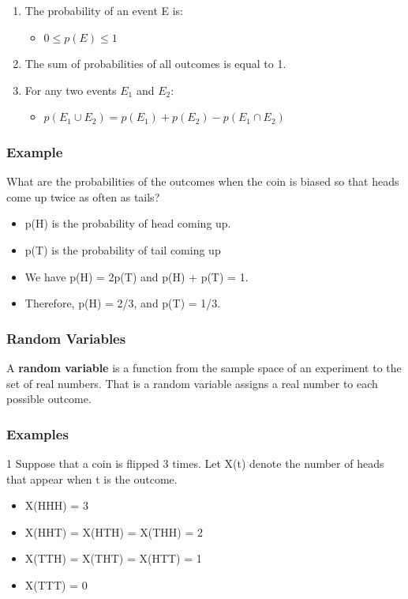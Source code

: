 \documentclass[12pt, letterpaper]{article}
\newcommand{\exheader}[1][ex]{{\tiny{#1}\normalsize}}
\begin{document}
\smallbreak
\begin{enumerate}
	\item The probability of an event E is:
	\begin{itemize}[label={}]
		\item $0 \le p(E) \le 1$
	\end{itemize}
	\item The sum of probabilities of all outcomes is equal to 1.
	\item For any two events $E_1$ and $E_2$:
	\begin{itemize}[label={}]
		\item $p(E_1 \cup E_2) = p(E_1) + p(E_2) - p(E_1 \cap E_2)$
	\end{itemize}
\end{enumerate}

\bigbreak
\bigbreak

\subsubsection*{Example}
What are the probabilities of the outcomes when the coin is
biased so that heads come up twice as often as tails?
\begin{itemize}[leftmargin=*,  label={}]
	\item p(H) is the probability of head coming up. 
	\item p(T) is the probability of tail coming up 
	\item We have p(H) = 2p(T) and p(H) + p(T) = 1.
	\item Therefore, p(H) = 2/3, and p(T) = 1/3.
\end{itemize}

\pagebreak

\subsubsection*{Random Variables}
A \textbf{random variable} is a function from the sample space of an experiment to the set of real numbers. That is a random variable assigns a real number to each possible outcome.

\bigbreak
\bigbreak

\subsubsection*{Examples}

\exheader[1] Suppose that a coin is flipped 3 times. Let X(t) denote the number of heads that appear when t is the outcome.
\begin{itemize}[label={}]
\item X(HHH) = 3
\item X(HHT) = X(HTH) = X(THH) = 2
\item X(TTH) = X(THT) = X(HTT) = 1
\item X(TTT) = 0
\end{itemize}
\end{document}
